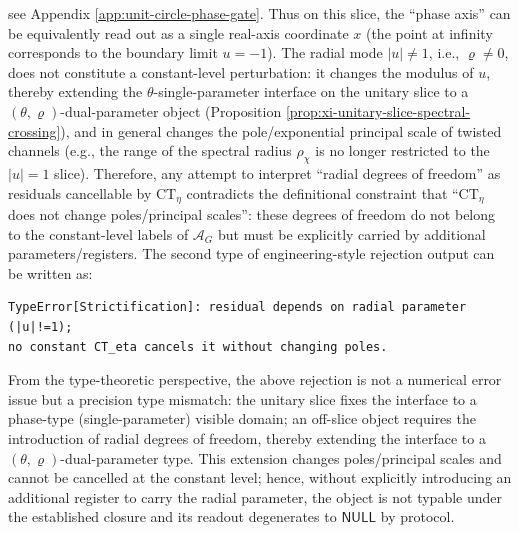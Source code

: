 see Appendix \ref{app:unit-circle-phase-gate}. Thus on this slice, the ``phase axis'' can be equivalently read out as a single real-axis coordinate \(x\) (the point at infinity corresponds to the boundary limit \(u=-1\)).
The radial mode \(|u|\neq 1\), i.e., \(\varrho\neq 0\), does not constitute a constant-level perturbation: it changes the modulus of \(u\), thereby extending the \(\theta\)-single-parameter interface on the unitary slice to a \((\theta,\varrho)\)-dual-parameter object (Proposition \ref{prop:xi-unitary-slice-spectral-crossing}), and in general changes the pole/exponential principal scale of twisted channels (e.g., the range of the spectral radius \(\rho_\chi\) is no longer restricted to the \(|u|=1\) slice).
Therefore, any attempt to interpret ``radial degrees of freedom'' as residuals cancellable by \(\mathrm{CT}_\eta\) contradicts the definitional constraint that ``\(\mathrm{CT}_\eta\) does not change poles/principal scales'': these degrees of freedom do not belong to the constant-level labels of \(\mathcal{A}_G\) but must be explicitly carried by additional parameters/registers.
The second type of engineering-style rejection output can be written as:
\begin{verbatim}
TypeError[Strictification]: residual depends on radial parameter (|u|!=1);
no constant CT_eta cancels it without changing poles.
\end{verbatim}

From the type-theoretic perspective, the above rejection is not a numerical error issue but a precision type mismatch: the unitary slice fixes the interface to a phase-type (single-parameter) visible domain; an off-slice object requires the introduction of radial degrees of freedom, thereby extending the interface to a \((\theta,\varrho)\)-dual-parameter type. This extension changes poles/principal scales and cannot be cancelled at the constant level; hence, without explicitly introducing an additional register to carry the radial parameter, the object is not typable under the established closure and its readout degenerates to \(\mathsf{NULL}\) by protocol.

